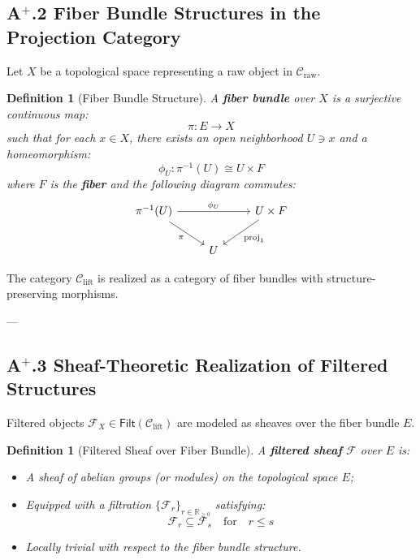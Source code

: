 \documentclass[11pt]{article}
\newtheorem{definition}[theorem]{Definition}
\begin{document}
\subsection*{A$^{+}$.2 Fiber Bundle Structures in the Projection Category}

Let $X$ be a topological space representing a raw object in $\mathcal{C}_{\mathrm{raw}}$.

\begin{definition}[Fiber Bundle Structure]
A \textbf{fiber bundle} over $X$ is a surjective continuous map:
\[
\pi : E \longrightarrow X
\]
such that for each $x \in X$, there exists an open neighborhood $U \ni x$ and a homeomorphism:
\[
\phi_U : \pi^{-1}(U) \cong U \times F
\]
where $F$ is the \textbf{fiber} and the following diagram commutes:
\[
\begin{tikzcd}
\pi^{-1}(U) \arrow[rr, "\phi_U"] \arrow[dr, "\pi"']
& & U \times F \arrow[dl, "\mathrm{proj}_1"] \\
& U &
\end{tikzcd}
\]
\end{definition}

The category $\mathcal{C}_{\mathrm{lift}}$ is realized as a category of fiber bundles with structure-preserving morphisms.

---

\subsection*{A$^{+}$.3 Sheaf-Theoretic Realization of Filtered Structures}

Filtered objects $\mathcal{F}_X \in \mathsf{Filt}(\mathcal{C}_{\mathrm{lift}})$ are modeled as sheaves over the fiber bundle $E$.

\begin{definition}[Filtered Sheaf over Fiber Bundle]
A \textbf{filtered sheaf} $\mathcal{F}$ over $E$ is:

\begin{itemize}
    \item A sheaf of abelian groups (or modules) on the topological space $E$;
    \item Equipped with a filtration $\{ \mathcal{F}_r \}_{r \in \mathbb{R}_{\geq 0}}$ satisfying:
    \[
    \mathcal{F}_r \subseteq \mathcal{F}_s \quad \text{for} \quad r \leq s
    \]
    \item Locally trivial with respect to the fiber bundle structure.
\end{itemize}
\end{definition}
\end{document}
